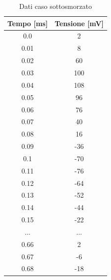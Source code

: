 \documentclass[letterpaper,12pt]{article}
\begin{document}
\begin{table}[htbp]
	\centering
	\caption{Dati caso sottosmorzato}
	\begin{tabular}{cc}
		\toprule
		Tempo [ms] & Tensione [mV] \\
		\midrule
		0.0        & 2             \\
		0.01       & 8             \\
		0.02       & 60            \\
		0.03       & 100           \\
		0.04       & 108           \\
		0.05       & 96            \\
		0.06       & 76            \\
		0.07       & 40            \\
		0.08       & 16            \\
		0.09       & -36           \\
		0.1        & -70           \\
		0.11       & -76           \\
		0.12       & -64           \\
		0.13       & -52           \\
		0.14       & -44           \\
		0.15       & -22           \\
		...        & ...           \\
		0.66       & 2             \\
		0.67       & -6            \\
		0.68       & -18           \\
		\bottomrule
	\end{tabular}
	\label{tab:dati_RLC_ssm}
\end{table}
\end{document}
